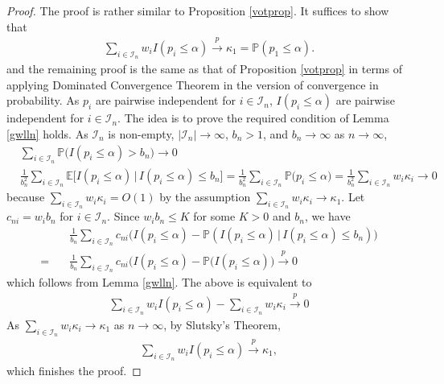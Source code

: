 \documentclass[11pt]{article}
\def\mc#1{\mathcal{#1}} %
\def\E{\mathbb{E}} %
\def\mc#1{\mathcal{#1}}
\def\P{\mathbb{P}}
\def\cp{\overset{p}{\to}}
\theoremstyle{definition}
\begin{document}
\begin{proof}
  The proof is rather similar to Proposition \ref{votprop}. It suffices to show that
  \begin{align*}
   \sum_{i\in \mc{I}_n} w_i I(p_i \leq  \alpha) \cp \kappa_1 =  \P(p_1 \leq \alpha).
  \end{align*}
  and the remaining proof is the same as that of Proposition \ref{votprop} in terms of applying Dominated Convergence Theorem in the version of  convergence in probability. As $p_i$ are pairwise independent for $i\in \mc{I}_n$, $I(p_i\leq \alpha)$ are pairwise independent for $i \in \mc{I}_n$. The idea is to prove the required condition of Lemma \ref{gwlln} holds. As  $\mc{I}_n$  is non-empty, $|\mc{I}_n| \to \infty$, $b_n > 1$, and  $b_n \to \infty$ as $n \to \infty$, 
  \begin{align*}
    & \sum_{i\in \mc{I}_n} \P\big( I(p_i \leq  \alpha) > b_n\big) \to 0\\
   & \frac{1}{b_n^2} \sum_{i\in \mc{I}_n} \E\big[ I(p_i \leq  \alpha) \,|\, I(p_i \leq  \alpha) \leq b_n\big]
     =  \frac{1}{b_n^2} \sum_{i\in \mc{I}_n} \P\big(p_i \leq\alpha \big)
     = \frac{1}{b_n^2} \sum_{i\in \mc{I}_n} w_i \kappa_i  \to 0
  \end{align*}
  because $ \sum_{i\in \mc{I}_n} w_i \kappa_i = O(1)$ by the assumption $\sum_{i\in \mc{I}_n} w_i \kappa_i \to \kappa_{1}$. Let $c_{ni} = w_i b_n$ for $i \in \mc{I}_n$. Since $w_i b_n\leq K$ for some $K > 0$ and $b_n$, we have 
  \begin{align*}
    & \frac{1}{b_n} \sum_{i\in \mc{I}_n}  c_{ni} \big(  I(p_i \leq  \alpha) - \P( I(p_i \leq  \alpha) \, |\,  I(p_i \leq  \alpha)  \leq b_n )  \big) \\
  = \quad     &\frac{1}{b_n} \sum_{i\in \mc{I}_n}  c_{ni} \big(  I(p_i \leq  \alpha) - \P( I(p_i \leq  \alpha) \big)  \cp 0
  \end{align*}
  which follows from Lemma \ref{gwlln}. The above is equivalent to
  \begin{align*}
   \sum_{i\in \mc{I}_n}  w_i I(p_i \leq  \alpha) - \sum_{i\in \mc{I}_n} w_i  \kappa_i  \cp 0
  \end{align*}
  As $\sum_{i\in \mc{I}_n} w_i  \kappa_i\to \kappa_1$ as $n \to \infty$, by Slutsky's Theorem,
  \begin{align*}
     \sum_{i\in \mc{I}_n}  w_i I(p_i \leq  \alpha)  \cp \kappa_1,
  \end{align*}
  which finishes the proof.
\end{proof}






%

	
\end{document}
